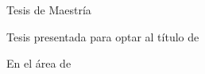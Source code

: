 \begin{titlepage}
    {\large Tesis de Maestría} \par
    \vspace{0.3cm} %

    {\large Tesis presentada para optar al título de\\ \degreeGranted} \par
    \vspace{0.3cm} %

    {\large En el área de\\ \subjectField} \par

    \vfill %

    {\large \departmentName \\ \facultyName \\ \universityName} \par
    \vspace{0.5cm} %

    {\large \thesisDate} \par
    \vspace{0.5cm} %

\end{titlepage}

\ClearShipoutPictureBG %
\clearpage %